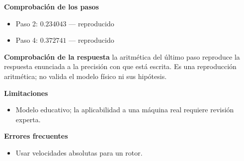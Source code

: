 \documentclass[10pt,openany]{book}
\begin{document}
\begin{tcolorbox}[title={Problema resuelto 1}, studiumworked, breakable]
\noindent\textbf{Comprobación de los pasos}
\begin{itemize}
\item Paso 2: $0.234043$ — reproducido
\item Paso 4: $0.372741$ — reproducido
\end{itemize}

\noindent\textbf{Comprobación de la respuesta} la aritmética del último paso reproduce la respuesta enunciada a la precisión con que está escrita. Es una reproducción aritmética; no valida el modelo físico ni sus hipótesis.

\noindent\textbf{Limitaciones}
\begin{itemize}
\item Modelo educativo; la aplicabilidad a una máquina real requiere revisión experta.
\end{itemize}

\noindent\textbf{Errores frecuentes}
\begin{itemize}
\item Usar velocidades absolutas para un rotor.
\end{itemize}
\end{tcolorbox}
\end{document}
